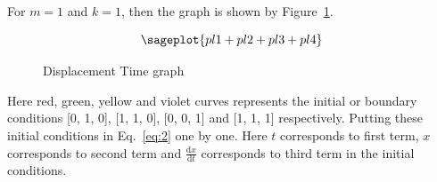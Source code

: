 For $m=1$ and $k=1$, then the graph is shown by Figure~\ref{fig:Displacement Time graph1}.
\begin{figure}[h!]
$$\sageplot{pl1+pl2+pl3+pl4}$$
\caption{Displacement Time graph}
\label{fig:Displacement Time graph1}
\end{figure}
Here red, green, yellow and violet curves represents the initial or boundary 
conditions [0, 1, 0], [1, 1, 0], [0, 0, 1] and [1, 1, 1] respectively. Putting 
these initial conditions in Eq.~\ref{eq:2} one by one. Here $t$ corresponds to first 
term, $x$ corresponds to second term and $\frac{\mathrm{d}x}{\mathrm{d}t}$ 
corresponds to third term in the initial conditions.
